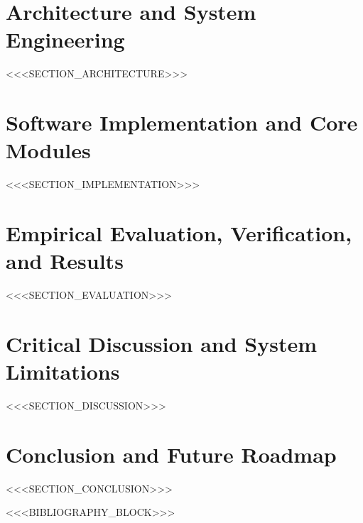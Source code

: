 \documentclass[12pt,oneside,a4paper]{report}
\begin{document}
\chapter{Architecture and System Engineering}
<<<SECTION_ARCHITECTURE>>>

\chapter{Software Implementation and Core Modules}
<<<SECTION_IMPLEMENTATION>>>

\chapter{Empirical Evaluation, Verification, and Results}
<<<SECTION_EVALUATION>>>

\chapter{Critical Discussion and System Limitations}
<<<SECTION_DISCUSSION>>>

\chapter{Conclusion and Future Roadmap}
<<<SECTION_CONCLUSION>>>

<<<BIBLIOGRAPHY_BLOCK>>>
\end{document}
